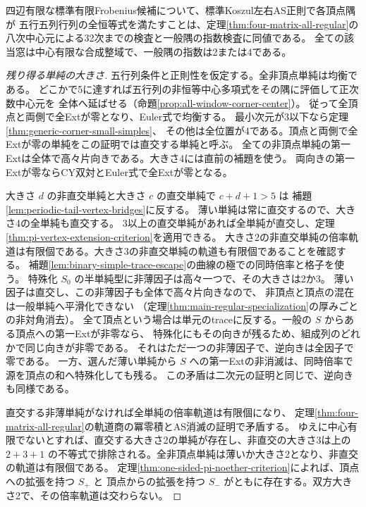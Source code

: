 \begin{theorem}\label{thm:five-matrix-finite-windows}
四辺有限な標準有限Frobenius候補について、標準Koszul左右AS正則で各頂点隅が
五行五列行列の全恒等式を満たすことは、定理\ref{thm:four-matrix-all-regular}の
八次中心元による32次までの検査と一般隅の指数検査に同値である。
全ての該当窓は中心有限な合成整域で、一般隅の指数は2または4である。
\end{theorem}
\begin{proof}[残り得る単純の大きさ]
五行列条件と正則性を仮定する。全非頂点単純は均衡である。
どこかで5に達すれば五行列の非恒等中心多項式をその隅に評価して正次数中心元を
全体へ延ばせる（命題\ref{prop:all-window-corner-center}）。
従って全頂点と両側で全Extが零となり、Euler式で均衡する。
最小次元が3以下なら定理\ref{thm:generic-corner-small-simples}、
その他は全位置が4である。頂点と両側で全Extが零の単純をこの証明では直交する単純と呼ぶ。
全ての非頂点単純の第一Extは全体で高々片向きである。大きさ4には直前の補題を使う。
両向きの第一Extが零ならCY双対とEuler式で全Extが零となる。

大きさ $d$ の非直交単純と大きさ $c$ の直交単純で $c+d+1>5$ は
補題\ref{lem:periodic-tail-vertex-bridges}に反する。
薄い単純は常に直交するので、大きさ4の全単純も直交する。
3以上の直交単純があれば全単純が直交し、定理\ref{thm:pi-vertex-extension-criterion}を適用できる。
大きさ2の非直交単純の倍率軌道は有限個である。大きさ3の非直交単純の軌道も有限個であることを確認する。
補題\ref{lem:binary-simple-trace-escape}の曲線の極での同時倍率と格子を使う。
特殊化 $S_0$ の半単純型に非薄因子は高々一つで、その大きさは2か3。
薄い因子は直交し、この非薄因子も全体で高々片向きなので、
非頂点と頂点の混在は一般単純へ平滑化できない
（定理\ref{thm:main-regular-specialization}の厚みごとの非対角消去）。
全て頂点という場合は単元のtraceに反する。一般の $S$ からある頂点への第一Extが非零なら、
特殊化にもその向きが残るため、組成列のどれかで同じ向きが非零である。
それはただ一つの非薄因子で、逆向きは全因子で零である。
一方、選んだ薄い単純から $S$ への第一Extの非消滅は、同時倍率で源を頂点の和へ特殊化しても残る。
この矛盾は二次元の証明と同じで、逆向きも同様である。

直交する非薄単純がなければ全単純の倍率軌道は有限個になり、
定理\ref{thm:four-matrix-all-regular}の軌道商の冪零積とAS消滅の証明で矛盾する。
ゆえに中心有限でないとすれば、直交する大きさ2の単純が存在し、非直交の大きさ3は上の
$2+3+1$ の不等式で排除される。全非頂点単純は薄いか大きさ2となり、非直交の軌道は有限個である。
定理\ref{thm:one-sided-pi-noether-criterion}によれば、頂点への拡張を持つ $S_+$ と
頂点からの拡張を持つ $S_-$ がともに存在する。双方大きさ2で、その倍率軌道は交わらない。
\end{proof}

